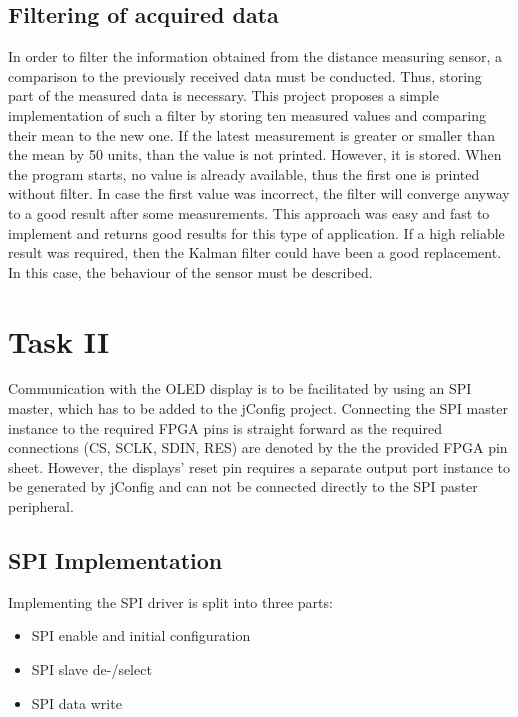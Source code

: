 		\subsection{Filtering of acquired data} %
		\label{sub:filter}
			In order to filter the information obtained from the distance measuring sensor, a comparison to the previously received data must be conducted. Thus, storing part of the measured data is necessary.
			This project proposes a simple implementation of such a filter by storing ten measured values and comparing their mean to the new one. If the latest measurement is greater or smaller than the mean by 50 units, than the value is not printed. However, it is stored. When the program starts, no value is already available, thus the first one is printed without filter. In case the first value was incorrect, the filter will converge anyway to a good result after some measurements.
			This approach was easy and fast to implement and returns good results for this type of application. If a high reliable result was required, then the Kalman filter could have been a good replacement. In this case, the behaviour of the sensor must be described.

	\section{Task II} %
	\label{sec:impl_task_2}
		Communication with the OLED display is to be facilitated by using an SPI master, which has to be added to the jConfig project. Connecting the SPI master instance to the required FPGA pins is straight forward as the required connections (CS, SCLK, SDIN, RES) are denoted by the the provided FPGA pin sheet. However, the displays' reset pin requires a separate output port instance to be generated by jConfig and can not be connected directly to the SPI paster peripheral. 

		\subsection{SPI Implementation} %
		\label{sub:impl_spi_implementation}
			Implementing the SPI driver is split into three parts:

			\begin{itemize}
				\item SPI enable and initial configuration
				\item SPI slave de-/select
				\item SPI data write
	   		\end{itemize}

